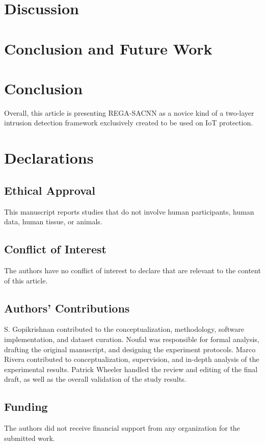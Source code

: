 \documentclass[a4paper,fleqn]{cas-dc}
\numberwithin{equation}{section}
\begin{document}
\section{Discussion}

\section{Conclusion and Future Work}








\section{Conclusion}

Overall, this article is presenting REGA-SACNN as a novice kind of a two-layer intrusion detection framework exclusively created to be used on IoT protection. 


\section*{Declarations}
\subsection*{Ethical Approval}
This manuscript reports studies that do not involve human participants, human data, human tissue, or animals.

\subsection*{Conflict of Interest}
The authors have no conflict of interest to declare that are relevant to the content of this article.

\subsection*{Authors' Contributions}
S. Gopikrishnan contributed to the conceptualization, methodology, software implementation, and dataset curation. Noufal was responsible for formal analysis, drafting the original manuscript, and designing the experiment protocols. Marco Rivera contributed to conceptualization, supervision, and in-depth analysis of the experimental results. Patrick Wheeler handled the review and editing of the final draft, as well as the overall validation of the study results.


\subsection*{Funding}
The authors did not receive financial support from any organization for the submitted work.
\end{document}
